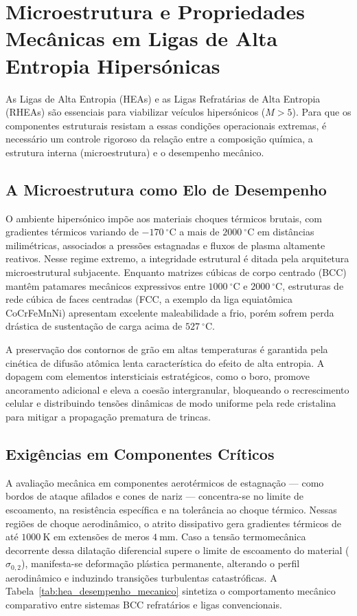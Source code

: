 \section{Microestrutura e Propriedades Mecânicas em Ligas de Alta Entropia Hipersónicas}\label{sec:microestrutura_propriedades_hea}

As Ligas de Alta Entropia (HEAs) e as Ligas Refratárias de Alta Entropia (RHEAs) são essenciais para viabilizar veículos hipersónicos ($M > 5$). Para que os componentes estruturais resistam a essas condições operacionais extremas, é necessário um controle rigoroso da relação entre a composição química, a estrutura interna (microestrutura) e o desempenho mecânico.

\subsection{A Microestrutura como Elo de Desempenho}\label{subsec:microestrutura_elo_desempenho}

O ambiente hipersónico impõe aos materiais choques térmicos brutais, com gradientes térmicos variando de $-170~^\circ\mathrm{C}$ a mais de $2000~^\circ\mathrm{C}$ em distâncias milimétricas, associados a pressões estagnadas e fluxos de plasma altamente reativos. Nesse regime extremo, a integridade estrutural é ditada pela arquitetura microestrutural subjacente. Enquanto matrizes cúbicas de corpo centrado (BCC) mantêm patamares mecânicos expressivos entre $1000~^\circ\mathrm{C}$ e $2000~^\circ\mathrm{C}$, estruturas de rede cúbica de faces centradas (FCC, a exemplo da liga equiatômica CoCrFeMnNi) apresentam excelente maleabilidade a frio, porém sofrem perda drástica de sustentação de carga acima de $527~^\circ\mathrm{C}$. 

A preservação dos contornos de grão em altas temperaturas é garantida pela cinética de difusão atômica lenta característica do efeito de alta entropia. A dopagem com elementos intersticiais estratégicos, como o boro, promove ancoramento adicional e eleva a coesão intergranular, bloqueando o recrescimento celular e distribuindo tensões dinâmicas de modo uniforme pela rede cristalina para mitigar a propagação prematura de trincas.

\subsection{Exigências em Componentes Críticos}\label{subsec:exigencias_criticos}

A avaliação mecânica em componentes aerotérmicos de estagnação --- como bordos de ataque afilados e cones de nariz --- concentra-se no limite de escoamento, na resistência específica e na tolerância ao choque térmico. Nessas regiões de choque aerodinâmico, o atrito dissipativo gera gradientes térmicos de até $1000~\mathrm{K}$ em extensões de meros $4~\mathrm{mm}$. Caso a tensão termomecânica decorrente dessa dilatação diferencial supere o limite de escoamento do material ($\sigma_{0{,}2}$), manifesta-se deformação plástica permanente, alterando o perfil aerodinâmico e induzindo transições turbulentas catastróficas. A Tabela~\ref{tab:hea_desempenho_mecanico} sintetiza o comportamento mecânico comparativo entre sistemas BCC refratários e ligas convencionais.

